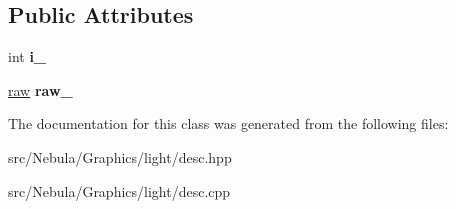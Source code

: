 \subsection*{\-Public \-Attributes}
\begin{DoxyCompactItemize}
\item 
\hypertarget{classNeb_1_1light_1_1desc_ab418cae849285845ccaf1083e64c762a}{int {\bfseries i\-\_\-}}\label{classNeb_1_1light_1_1desc_ab418cae849285845ccaf1083e64c762a}

\item 
\hypertarget{classNeb_1_1light_1_1desc_a53adc31d070f40782ce0115365479cb9}{\hyperlink{classNeb_1_1light_1_1raw}{raw} {\bfseries raw\-\_\-}}\label{classNeb_1_1light_1_1desc_a53adc31d070f40782ce0115365479cb9}

\end{DoxyCompactItemize}


\-The documentation for this class was generated from the following files\-:\begin{DoxyCompactItemize}
\item 
src/\-Nebula/\-Graphics/light/desc.\-hpp\item 
src/\-Nebula/\-Graphics/light/desc.\-cpp\end{DoxyCompactItemize}
